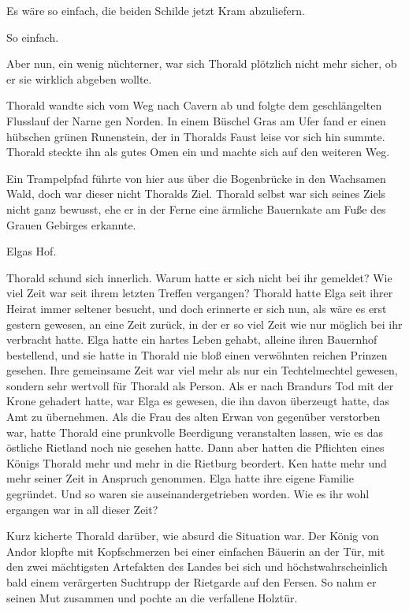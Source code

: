 Es wäre so einfach, die beiden Schilde jetzt Kram abzuliefern.

So einfach.

Aber nun, ein wenig nüchterner, war sich Thorald plötzlich nicht mehr sicher, ob er sie wirklich abgeben wollte.



\trennzeichen



Thorald wandte sich vom Weg nach Cavern ab und folgte dem geschlängelten Flusslauf der Narne gen Norden. In einem Büschel Gras am Ufer fand er einen hübschen grünen Runenstein, der in Thoralds Faust leise vor sich hin summte. Thorald steckte ihn als gutes Omen ein und machte sich auf den weiteren Weg.

Ein Trampelpfad führte von hier aus über die Bogenbrücke in den Wachsamen Wald, doch war dieser nicht Thoralds Ziel. Thorald selbst war sich seines Ziels nicht ganz bewusst, ehe er in der Ferne eine ärmliche Bauernkate am Fuße des Grauen Gebirges erkannte.

Elgas Hof.

Thorald schund sich innerlich. Warum hatte er sich nicht bei ihr gemeldet? Wie viel Zeit war seit ihrem letzten Treffen vergangen? Thorald hatte Elga seit ihrer Heirat immer seltener besucht, und doch erinnerte er sich nun, als wäre es erst gestern gewesen, an eine Zeit zurück, in der er so viel Zeit wie nur möglich bei ihr verbracht hatte. Elga hatte ein hartes Leben gehabt, alleine ihren Bauernhof bestellend, und sie hatte in Thorald nie bloß einen verwöhnten reichen Prinzen gesehen. Ihre gemeinsame Zeit war viel mehr als nur ein Techtelmechtel gewesen, sondern sehr wertvoll für Thorald als Person. Als er nach Brandurs Tod mit der Krone gehadert hatte, war Elga es gewesen, die ihn davon überzeugt hatte, das Amt zu übernehmen. Als die Frau des alten Erwan von gegenüber verstorben war, hatte Thorald eine prunkvolle Beerdigung veranstalten lassen, wie es das östliche Rietland noch nie gesehen hatte. Dann aber hatten die Pflichten eines Königs Thorald mehr und mehr in die Rietburg beordert. Ken hatte mehr und mehr seiner Zeit in Anspruch genommen. Elga hatte ihre eigene Familie gegründet. Und so waren sie auseinandergetrieben worden. Wie es ihr wohl ergangen war in all dieser Zeit?

Kurz kicherte Thorald darüber, wie absurd die Situation war. Der König von Andor klopfte mit Kopfschmerzen bei einer einfachen Bäuerin an der Tür, mit den zwei mächtigsten Artefakten des Landes bei sich und höchstwahrscheinlich bald einem verärgerten Suchtrupp der Rietgarde auf den Fersen. So nahm er seinen Mut zusammen und pochte an die verfallene Holztür.

